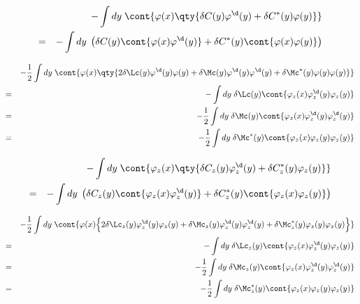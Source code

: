 \documentclass[10.5pt,a4paper]{jreport}
\begin{document}
\begin{eqnarray}
  &&-\int d{y}\; \cont{ \varphi(x) \qty{ \delta C(y) \varphi^\d(y) + \delta C^*(y)\varphi(y) } } \\
  &=& -\int d{y}\; \left( \delta C(y)\cont{\varphi(x) \varphi^\d(y)}  +\delta C^*(y)\cont{\varphi(x) \varphi(y)}   \right)
\end{eqnarray}

\begin{eqnarray}
  &&-\frac{1}{2}\int d{y}\; \cont{ \varphi(x) \qty{ 2\delta \Lc(y) \varphi^\d(y)\varphi(y) + \delta\Mc(y)\varphi^\d(y)\varphi^\d(y)+ \delta\Mc^*(y)\varphi(y)\varphi(y) } } \\
  &=& -\int d{y}\; \delta \Lc(y)  \cont{\varphi_{z}(x) \varphi_{z}^\d(y) \varphi_{z}(y)} \notag\\
  &=& -\frac12\int d{y}\; \delta \Mc(y)   \cont{\varphi_{z}(x) \varphi_{z}^\d(y) \varphi_{z}^\d(y)} \notag\\
  &=& -\frac12\int d{y}\; \delta \Mc^*(y) \cont{\varphi_{z}(x) \varphi_{z}(y) \varphi_{z}(y)} 	
\end{eqnarray}

\begin{eqnarray}
  &&-\int d{y}\; \cont{ \varphi_{z}(x) \qty{ \delta C_{z}(y)\varphi_{z}^\d(y) + \delta C_{z}^*(y)\varphi_{z}(y) } } \\
  &=& -\int d{y}\; \left( \delta C_{z}(y)\cont{\varphi_{z}(x) \varphi_{z}^\d(y)}  
  +\delta C_{z}^*(y)\cont{\varphi_{z}(x) \varphi_{z}(y)}   \right)
\end{eqnarray}

\begin{eqnarray}
  &&-\frac{1}{2}\int d{y}\; \cont{ \varphi(x) \Bigl\{ 2\delta \Lc_{z}(y) \varphi^\d_{z}(y)\varphi_{z}(y)+ \delta\Mc_{z}(y)\varphi^\d_{z}(y)\varphi^\d_{z}(y)+ \delta\Mc_{z}^*(y)\varphi_{z}(y)\varphi_{z}(y) \Bigr\} } \notag\\
  &=& -\int d{y}\; \delta \Lc_{z}(y)  \cont{\varphi_{z}(x) \varphi_{z}^\d(y) \varphi_{z}(y)} \\
  &=& -\frac12\int d{y}\; \delta \Mc_{z}(y)   \cont{\varphi_{z}(x) \varphi_{z}^\d(y) \varphi_{z}^\d(y)} \notag\\
  &=& -\frac12\int d{y}\; \delta \Mc^*_{z}(y) \cont{\varphi_{z}(x) \varphi_{z}(y) \varphi_{z}(y)} 	
\end{eqnarray}
\end{document}
